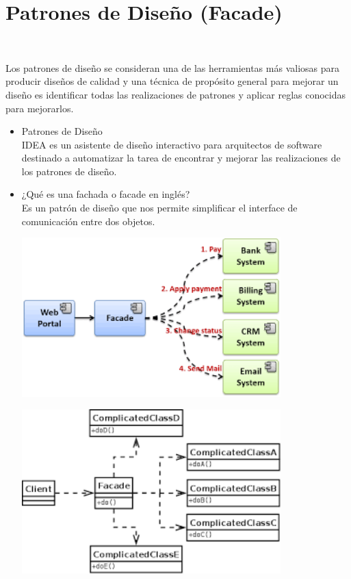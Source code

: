 \section{Patrones de Diseño (Facade)} 
\textbf{}\\
\begin{flushleft}
Los patrones de diseño se consideran una de las herramientas más valiosas para producir diseños de calidad y una técnica de propósito general para mejorar un diseño es identificar todas las realizaciones de patrones y aplicar reglas conocidas para mejorarlos.

\begin{itemize}
	\item Patrones de Diseño
	\\IDEA es un asistente de diseño interactivo para arquitectos de software destinado a automatizar la tarea de encontrar y mejorar las realizaciones de los patrones de diseño.


	


	\item ¿Qué es una fachada o facade en inglés?
	\\ Es un patrón de diseño que nos permite simplificar el interface de comunicación entre dos objetos.
	\begin{center}
	\includegraphics[width=10cm]{./images/1} 
	\end{center}

	
	\begin{center}
	\includegraphics[width=10cm]{./images/2} 
	\end{center}



\end{itemize}
\end{flushleft}
